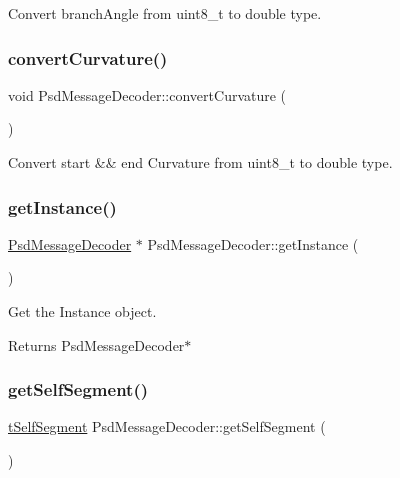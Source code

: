 Convert branch\+Angle from uint8\+\_\+t to double type. 

\mbox{\label{class_psd_message_decoder_a88607430974b48dd7379f636f3bb0b35}} 
\subsubsection{\texorpdfstring{convert\+Curvature()}{convertCurvature()}}
{\footnotesize\ttfamily void Psd\+Message\+Decoder\+::convert\+Curvature (\begin{DoxyParamCaption}{ }\end{DoxyParamCaption})}



Convert start \&\& end Curvature from uint8\+\_\+t to double type. 

\mbox{\label{class_psd_message_decoder_a544f32786ee3bf1b7747fd1b82604ccf}} 
\subsubsection{\texorpdfstring{get\+Instance()}{getInstance()}}
{\footnotesize\ttfamily \hyperlink{class_psd_message_decoder}{Psd\+Message\+Decoder} $\ast$ Psd\+Message\+Decoder\+::get\+Instance (\begin{DoxyParamCaption}{ }\end{DoxyParamCaption})\hspace{0.3cm}{\ttfamily [static]}}



Get the Instance object. 

\begin{DoxyReturn}{Returns}
Psd\+Message\+Decoder$\ast$ 
\end{DoxyReturn}
\mbox{\label{class_psd_message_decoder_a7d7ee9d6bcaefbb6375cf5ab5b63d232}} 
\subsubsection{\texorpdfstring{get\+Self\+Segment()}{getSelfSegment()}}
{\footnotesize\ttfamily \hyperlink{_psd_message_decoder_8h_a6c858ba8556a68d900d0eca9dc406232}{t\+Self\+Segment} Psd\+Message\+Decoder\+::get\+Self\+Segment (\begin{DoxyParamCaption}{ }\end{DoxyParamCaption})}



